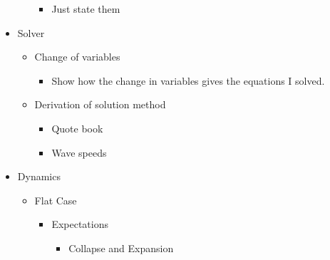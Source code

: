 \documentclass[12pt]{article}
\begin{document}
\begin{itemize}
\begin{itemize}
\begin{itemize}
                    \item Just state them

                \end{itemize}

        \end{itemize}

    \item Solver

        \begin{itemize}

            \item Change of variables

                \begin{itemize}

                    \item Show how the change in variables gives the equations I solved.

                \end{itemize}

            \item Derivation of solution method

                \begin{itemize}

                    \item Quote book

                    \item Wave speeds

                \end{itemize}

        \end{itemize}

    \item Dynamics

        \begin{itemize}

            \item Flat Case

                \begin{itemize}

                    \item Expectations

                        \begin{itemize}

                            \item Collapse and Expansion

                        \end{itemize}


\end{itemize}
\end{itemize}
\end{itemize}
\end{document}
